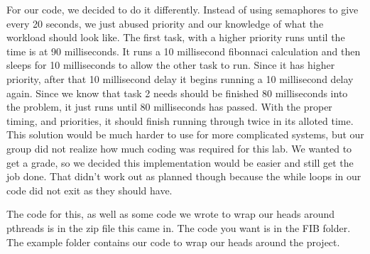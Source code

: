 \documentclass{article}
\begin{document}
For our code, we decided to do it differently. Instead of using semaphores to give every 20 seconds, we just abused priority and our knowledge of what the workload should look like. The first task, with a higher priority runs until the time is at 90 milliseconds. It runs a 10 millisecond fibonnaci calculation and then sleeps for 10 milliseconds to allow the other task to run. Since it has higher priority, after that 10 millisecond delay it begins running a 10 millisecond delay again.
Since we know that task 2 needs should be finished 80 milliseconds into the problem, it just runs until 80 milliseconds has passed. With the proper timing, and priorities, it should finish running through twice in its alloted time. This solution would be much harder to use for more complicated systems, but our group did not realize how much coding was required for this lab. We wanted to get a grade, so we decided this implementation would be easier and still get the job done. That
didn't work out as planned though because the while loops in our code did not exit as they should have.

The code for this, as well as some code we wrote to wrap our heads around pthreads is in the zip file this came in. The code you want is in the FIB folder. The example folder contains our code to wrap our heads around the project.
\end{document}
